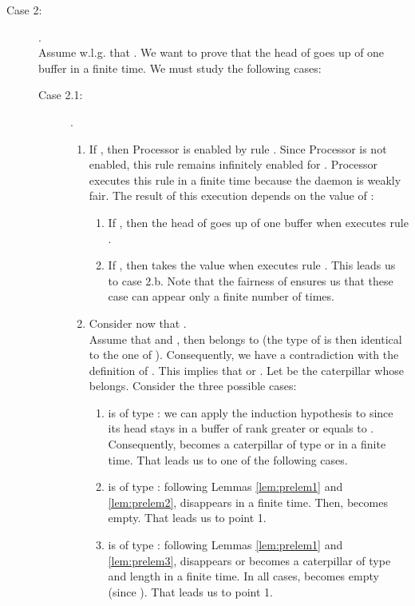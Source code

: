 \documentclass[11pt]{article}
\newenvironment{proof}{{\noindent\bf Proof. } }{{\hfill }}
\begin{document}
\begin{proof}
\begin{description}
\begin{description}
\item [Case 2:] .\\


Assume w.l.g. that . We want to prove that the head of  goes up of one buffer in a finite time. We must study the following cases:

\begin{description}
\item [Case 2.1:] .\\

\begin{enumerate}
\item If , then Processor  is enabled by rule . Since Processor  is not enabled, this rule remains infinitely enabled for . Processor  executes this rule in a finite time because the daemon is weakly fair. The result of this execution depends on the value of :

\begin{enumerate}
\item If , then the head of  goes up of one buffer when  executes rule .
\item If , then  takes the value  when  executes rule . This leads us to case 2.b. Note that the fairness of   ensures us that these case can appear only a finite number of times.
\end{enumerate}

\item Consider now that .\\
Assume that  and , then   belongs to  (the type of  is then identical to the one of  ). Consequently, we have a contradiction with the definition of . This implies that  or . Let  be the caterpillar whose  belongs. Consider the three possible cases:

\begin{enumerate}
\item  is of type : we can apply the induction hypothesis to  since its head stays in a buffer of rank greater or equals to . Consequently,  becomes a caterpillar of type  or  in a finite time. That leads us to one of the following cases.
\item  is of type : following Lemmas \ref{lem:prelem1} and \ref{lem:prelem2},  disappears in a finite time. Then,  becomes empty. That leads us to point 1.
\item  is of type :  following Lemmas \ref{lem:prelem1} and \ref{lem:prelem3},  disappears or becomes a caterpillar of type  and length  in a finite time. In all cases,  becomes empty (since ). That leads us to point 1.
\end{enumerate}
\end{enumerate}


\end{description}
\end{description}
\end{description}
\end{proof}
\end{document}
